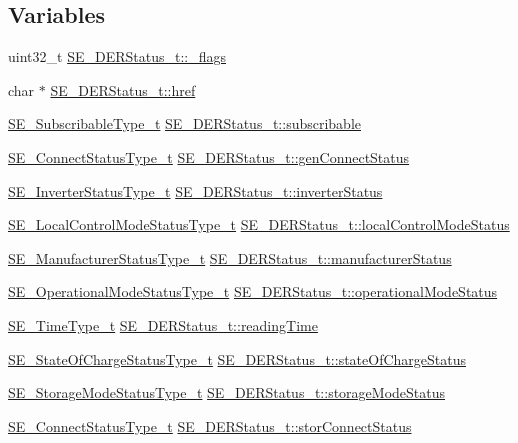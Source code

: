 \subsection*{Variables}
\begin{DoxyCompactItemize}
\item 
uint32\+\_\+t \hyperlink{group__DERStatus_gab4c1e1321c0115d4bf5b67665d12f296}{S\+E\+\_\+\+D\+E\+R\+Status\+\_\+t\+::\+\_\+flags}
\item 
char $\ast$ \hyperlink{group__DERStatus_ga412be5b1d9e2bcc7acff42c20bec4f2d}{S\+E\+\_\+\+D\+E\+R\+Status\+\_\+t\+::href}
\item 
\hyperlink{group__SubscribableType_ga5c41f553d369710ed34619266bf2551e}{S\+E\+\_\+\+Subscribable\+Type\+\_\+t} \hyperlink{group__DERStatus_ga6880d05b460ec1817d4bda4904674639}{S\+E\+\_\+\+D\+E\+R\+Status\+\_\+t\+::subscribable}
\item 
\hyperlink{structSE__ConnectStatusType__t}{S\+E\+\_\+\+Connect\+Status\+Type\+\_\+t} \hyperlink{group__DERStatus_ga9e187f594a02795f7901a8536eaf93fd}{S\+E\+\_\+\+D\+E\+R\+Status\+\_\+t\+::gen\+Connect\+Status}
\item 
\hyperlink{structSE__InverterStatusType__t}{S\+E\+\_\+\+Inverter\+Status\+Type\+\_\+t} \hyperlink{group__DERStatus_ga5c07bcc9536a224372b681863babfa29}{S\+E\+\_\+\+D\+E\+R\+Status\+\_\+t\+::inverter\+Status}
\item 
\hyperlink{structSE__LocalControlModeStatusType__t}{S\+E\+\_\+\+Local\+Control\+Mode\+Status\+Type\+\_\+t} \hyperlink{group__DERStatus_ga5ff487916a297613474b4be108121256}{S\+E\+\_\+\+D\+E\+R\+Status\+\_\+t\+::local\+Control\+Mode\+Status}
\item 
\hyperlink{structSE__ManufacturerStatusType__t}{S\+E\+\_\+\+Manufacturer\+Status\+Type\+\_\+t} \hyperlink{group__DERStatus_ga4d93047bbc5c2f04885400ca75e35d7e}{S\+E\+\_\+\+D\+E\+R\+Status\+\_\+t\+::manufacturer\+Status}
\item 
\hyperlink{structSE__OperationalModeStatusType__t}{S\+E\+\_\+\+Operational\+Mode\+Status\+Type\+\_\+t} \hyperlink{group__DERStatus_ga8db3dd530b0cbb5e02d952f763b30dd4}{S\+E\+\_\+\+D\+E\+R\+Status\+\_\+t\+::operational\+Mode\+Status}
\item 
\hyperlink{group__TimeType_ga6fba87a5b57829b4ff3f0e7638156682}{S\+E\+\_\+\+Time\+Type\+\_\+t} \hyperlink{group__DERStatus_gaced41f46b4b7e97358567bf65f377339}{S\+E\+\_\+\+D\+E\+R\+Status\+\_\+t\+::reading\+Time}
\item 
\hyperlink{structSE__StateOfChargeStatusType__t}{S\+E\+\_\+\+State\+Of\+Charge\+Status\+Type\+\_\+t} \hyperlink{group__DERStatus_ga288cbcbc32535bf38ed8931c49103c4b}{S\+E\+\_\+\+D\+E\+R\+Status\+\_\+t\+::state\+Of\+Charge\+Status}
\item 
\hyperlink{structSE__StorageModeStatusType__t}{S\+E\+\_\+\+Storage\+Mode\+Status\+Type\+\_\+t} \hyperlink{group__DERStatus_gae47ec69bc3ff69a8b5f7b36e49f4aed9}{S\+E\+\_\+\+D\+E\+R\+Status\+\_\+t\+::storage\+Mode\+Status}
\item 
\hyperlink{structSE__ConnectStatusType__t}{S\+E\+\_\+\+Connect\+Status\+Type\+\_\+t} \hyperlink{group__DERStatus_ga008c4b8df0ff5f20ee6ffc4336bda96e}{S\+E\+\_\+\+D\+E\+R\+Status\+\_\+t\+::stor\+Connect\+Status}
\end{DoxyCompactItemize}


